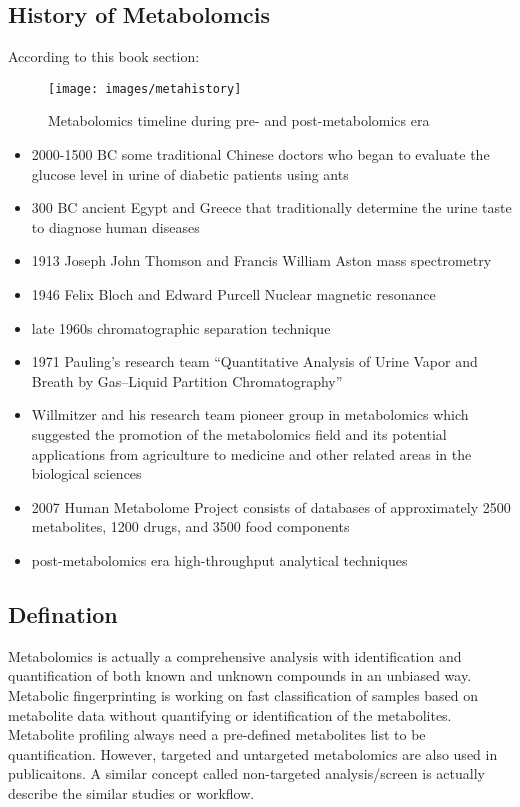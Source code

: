 \documentclass[
]{book}
\begin{document}
\hypertarget{history-of-metabolomcis}{%
\subsection{History of Metabolomcis}\label{history-of-metabolomcis}}

According to this book section\citep{kusonmano2016}:

\begin{figure}
\texttt{[image: images/metahistory]} \caption{Metabolomics timeline during pre- and post-metabolomics era}\label{fig:history2}
\end{figure}

\begin{itemize}
\item
  2000-1500 BC some traditional Chinese doctors who began to evaluate the glucose level in urine of diabetic patients using ants
\item
  300 BC ancient Egypt and Greece that traditionally determine the urine taste to diagnose human diseases
\item
  1913 Joseph John Thomson and Francis William Aston mass spectrometry
\item
  1946 Felix Bloch and Edward Purcell Nuclear magnetic resonance
\item
  late 1960s chromatographic separation technique
\item
  1971 Pauling's research team ``Quantitative Analysis of Urine Vapor and Breath by Gas--Liquid Partition Chromatography''
\item
  Willmitzer and his research team pioneer group in metabolomics which suggested the promotion of the metabolomics field and its potential applications from agriculture to medicine and other related areas in the biological sciences
\item
  2007 Human Metabolome Project consists of databases of approximately 2500 metabolites, 1200 drugs, and 3500 food components
\item
  post-metabolomics era high-throughput analytical techniques
\end{itemize}

\hypertarget{defination}{%
\subsection{Defination}\label{defination}}

Metabolomics is actually a comprehensive analysis with identification and quantification of both known and unknown compounds in an unbiased way. Metabolic fingerprinting is working on fast classification of samples based on metabolite data without quantifying or identification of the metabolites. Metabolite profiling always need a pre-defined metabolites list to be quantification\citep{madsen2010}. However, targeted and untargeted metabolomics are also used in publicaitons. A similar concept called non-targeted analysis/screen is actually describe the similar studies or workflow.
\end{document}
